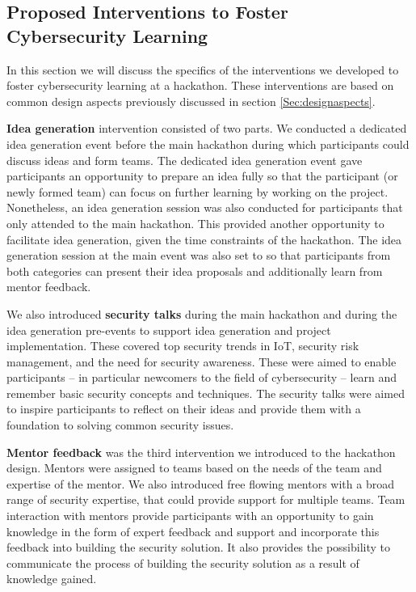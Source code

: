 \documentclass[runningheads]{llncs}
\begin{document}
\subsection{Proposed Interventions to Foster Cybersecurity Learning} \label{Sec:interventions}
In this section we will discuss the specifics of the interventions we developed to foster cybersecurity learning at a hackathon. These interventions are based on common design aspects previously discussed in section \ref{Sec:designaspects}.

\textbf{Idea generation} intervention consisted of two parts. We conducted a dedicated idea generation event before the main hackathon during which participants could discuss ideas and form teams. The dedicated idea generation event gave participants an opportunity to prepare an idea fully so that the participant (or newly formed team) can focus on further learning by working on the project. Nonetheless, an idea generation session was also conducted for participants that only attended to the main hackathon. This provided another opportunity to facilitate idea generation, given the time constraints of the hackathon. 
The idea generation session at the main event was also set to so that participants from both categories can present their idea proposals and additionally learn from mentor feedback. %

We also introduced \textbf{security talks} during the main hackathon and during the idea generation pre-events to support idea generation and project implementation. These covered top security trends in IoT, security risk management, and the need for security awareness. These were aimed to enable participants -- in particular newcomers to the field of cybersecurity -- learn and remember basic security concepts and techniques. The security talks were aimed to inspire participants to reflect on their ideas and provide them with a foundation to solving common security issues.

\textbf{Mentor feedback} was the third intervention we introduced to the hackathon design. Mentors were assigned to teams based on the needs of the team and expertise of the mentor. We also introduced free flowing mentors with a broad range of security expertise, that could provide support for multiple teams. Team interaction with mentors provide participants with an opportunity to gain knowledge in the form of expert feedback and support and incorporate this feedback into building the security solution. 
It also provides the possibility to communicate the process of building the security solution as a result of knowledge gained.
 
\end{document}
